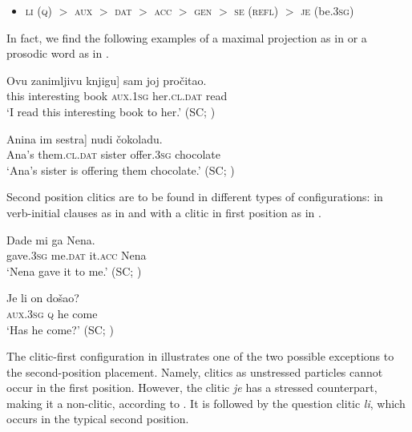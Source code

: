 \documentclass[output=paper,
colorlinks,
citecolor=brown,
newtxmath
]{langscibook}
\begin{document}
\begin{itemize}
\item \textsc{li} (\textsc{q}) $>$ \textsc{aux} $>$ \textsc{dat} $>$ \textsc{acc} $>$ \textsc{gen} $>$ \textsc{se} (\textsc{refl}) $>$ \textsc{je}
(be.\textsc{3sg})
\end{itemize}

\noindent In fact, we find the following examples of a maximal projection as in  or a prosodic word as in .


\ea\label{ex:zivojinovic:19}
\gll\minsp{[} Ovu  zanimljivu  knjigu] sam      joj         pročitao.\\
    {} this  interesting book    \textsc{aux.1sg}  her.\textsc{cl.dat} read \\
\glt `I read this interesting book to her.'
\hfill (SC; \citealt[219]{Franks.King2000})
\z



\ea\label{ex:zivojinovic:20}
\gll\minsp{[} Anina im          sestra] nudi      čokoladu.           \\
    {} Ana’s  them.\textsc{cl.dat} sister  offer.\textsc{3sg} chocolate \\
\glt `Ana’s sister is offering them chocolate.'
\hfill (SC; \citealt[414]{Progovac1996})
\z

\noindent Second position clitics are to be found in different types of configurations: in verb-initial clauses as in  and with a clitic in first position as in .


\ea\label{ex:zivojinovic:21}
\gll Dade      mi      ga      Nena.           \\
     gave.\textsc{3sg} me.\textsc{dat}  it.\textsc{acc}  Nena \\
\glt `Nena gave it to me.'
\hfill (SC; \citealt[222]{Franks.King2000})
\z


\ea\label{ex:zivojinovic:22}
\gll Je li on došao?\\
     \textsc{aux.3sg} \textsc{q} he come\\
\glt `Has he come?'
\hfill (SC; \citealt[46]{Radanovic-Kocic1988})
\z



\noindent The clitic-first configuration in  illustrates one of the two possible exceptions to the second-position placement. Namely, clitics as unstressed particles cannot occur in the first position. However, the clitic \textit{je} has a stressed counterpart, making it a non-clitic, according to \citet[226]{Franks.King2000}. It is followed by the question clitic \textit{li}, which occurs in the typical second position.
\end{document}

